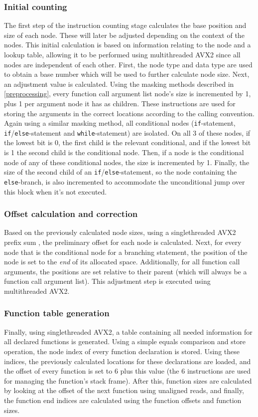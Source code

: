 \documentclass[12pt,dvipsnames]{article}
\newcommand{\icpp}[1]{\texttt{#1}}
\begin{document}
\subsubsection*{Initial counting}
The first step of the instruction counting stage calculates the base position and size of each node. These will later be adjusted depending on the context of the nodes. This initial calculation is based on information relating to the node and a lookup table, allowing it to be performed using multithreaded AVX2 since all nodes are independent of each other. First, the node type and data type are used to obtain a base number which will be used to further calculate node size. Next, an adjustment value is calculated. Using the masking methods described in \ref{preprocessing}, every function call argument list node's size is incremented by 1, plus 1 per argument node it has as children. These instructions are used for storing the arguments in the correct locations according to the calling convention. Again using a similar masking method, all conditional nodes (\icpp{if}-statement, \icpp{if}/\icpp{else}-statement and \icpp{while}-statement) are isolated. On all 3 of these nodes, if the lowest bit is 0, the first child is the relevant conditional, and if the lowest bit is 1 the second child is the conditional node. Then, if a node is the conditional node of any of these conditional nodes, the size is incremented by 1. Finally, the size of the second child of an \icpp{if}/\icpp{else}-statement, so the node containing the \icpp{else}-branch, is also incremented to accommodate the unconditional jump over this block when it's not executed.

\subsubsection*{Offset calculation and correction}
Based on the previously calculated node sizes, using a singlethreaded AVX2 prefix sum \cite{Zhang2020ParallelPS}, the preliminary offset for each node is calculated. Next, for every node that is the conditional node for a branching statement, the position of the node is set to the \textit{end} of its allocated space. Additionally, for all function call arguments, the positions are set relative to their parent (which will always be a function call argument list). This adjustment step is executed using multithreaded AVX2.

\subsubsection*{Function table generation}
Finally, using singlethreaded AVX2, a table containing all needed information for all declared functions is generated. Using a simple equals comparison and store operation, the node index of every function declaration is stored. Using these indices, the previously calculated locations for these declarations are loaded, and the offset of every function is set to 6 plus this value (the 6 instructions are used for managing the function's stack frame). After this, function sizes are calculated by looking at the offset of the next function using unaligned reads, and finally, the function end indices are calculated using the function offsets and function sizes.
\end{document}
